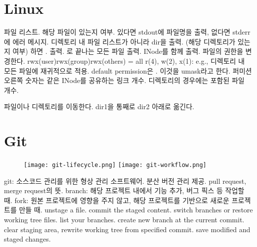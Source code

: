 \section{Linux}

\bitmz
  \itm {} 파일 리스트.
  \bitmz
    \itm {} \rarr 해당 파일이 있는지 여부. 있다면 stdout에 파일명을 출력, 없다면 stderr에 에러 메시지.
    \itm {} \rarr 디렉토리 내 파일 리스트가 아니라 dir을 출력. (해당 디렉토리가 있는지 여부) 하면 . 출력.
    \itm {} \rarr {}로 끝나는 모든 파일 출력.
    \itm {} \rarr INode를 함께 출력.
  \eitmz
  \itm {} 파일의 권한을 변경한다.
  \bitmz
    \itm rwx(user)rwx(group)rwx(others) = all
    \itm r(4), w(2), x(1): e.g., 
    \itm {} 디렉토리 내 모든 파일에 재귀적으로 적용.
    \itm default permission은 . 이것을 umask라고 한다.
    \itm 퍼미션 오른쪽 숫자는 같은 INode를 공유하는 링크 개수. 디렉토리의 경우에는 포함된 파일 개수.
  \eitmz

  \itm {} 파일이나 디렉토리를 이동한다.
  \bitmz
    \itm {} \rarr dir1을 통째로 dir2 아래로 옮긴다.
  \eitmz
\eitmz

\section{Git}

\begin{figure}[h]
  \centering
  \texttt{[image: git-lifecycle.png]}
  \texttt{[image: git-workflow.png]}
\end{figure}

\bitmz
  \itm git: 소스코드 관리를 위한 형상 관리 소프트웨어. 분산 버전 관리 제공.
  \itm pull request, merge request의 뜻.
  \itm branch: 해당 프로젝트 내에서 기능 추가, 버그 픽스 등 작업할 때.
  \itm fork: 원본 프로젝트에 영향을 주지 않고, 해당 프로젝트를 기반으로 새로운 프로젝트를 만들 때.
  \itm {} \rarr unstage a file.
  \itm {} \rarr commit the staged content.
  \itm {} \rarr switch branches or restore working tree files.
  \itm {} \rarr list your branches.
  \itm {} \rarr create new branch at the current commit.
  \itm {} \rarr clear staging area, rewrite working tree from specified commit.
  \itm {} \rarr save modified and staged changes.
\eitmz


